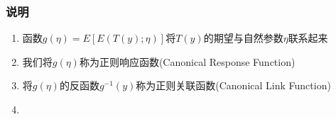 \subsubsection{说明}
\begin{enumerate}
	\item 函数$g(\eta) = E\left[E(T(y);\eta)\right]$将$T(y)$的期望与自然参数$\eta$联系起来
	\item 我们将$g(\eta)$称为正则响应函数(Canonical Response Function)
	\item 将$g(\eta)$的反函数$g^{-1}(y)$称为正则关联函数(Canonical Link Function)
	\item {\color{red}{关于正则响应函数，正则关联函数的理解待补充}}
\end{enumerate}



% 
















